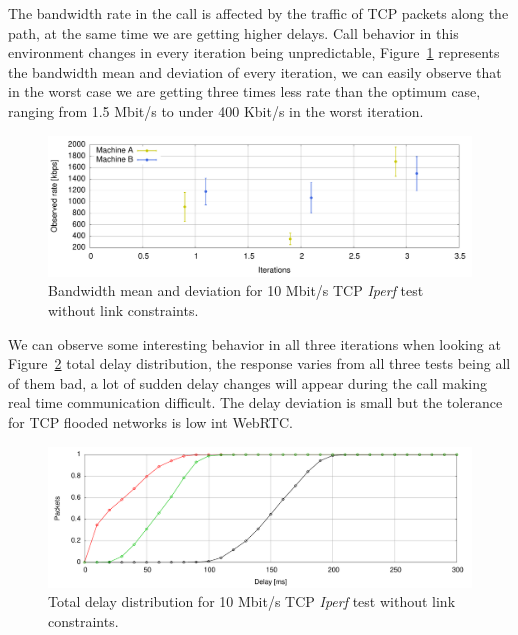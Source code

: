 The bandwidth rate in the call is affected by the traffic of TCP packets along the path, at the same time we are getting higher delays. Call behavior in this environment changes in every iteration being unpredictable, Figure~\ref{fig:iperfTestStd} represents the bandwidth mean and deviation of every iteration, we can easily observe that in the worst case we are getting three times less rate than the optimum case, ranging from 1.5 Mbit/s to under 400 Kbit/s in the worst iteration.

 \begin{figure}[h]
  \centering
    \includegraphics[width=1\textwidth]{./figures/iperf_std_mean_deviation_bw.pdf}
      \caption[Bandwidth mean and deviation for 10 Mbit/s TCP {\it Iperf} test without link constraints]{Bandwidth mean and deviation for 10 Mbit/s TCP {\it Iperf} test without link constraints.}
	\label{fig:iperfTestStd}
\end{figure}

We can observe some interesting behavior in all three iterations when looking at Figure~\ref{fig:iperfTestStdDelay} total delay distribution, the response varies from all three tests being all of them bad, a lot of sudden delay changes will appear during the call making real time communication difficult. The delay deviation is small but the tolerance for TCP flooded networks is low int WebRTC.

 \begin{figure}[h]
  \centering
    \includegraphics[width=1\textwidth]{./figures/iperf_std_total_delay_distribution.pdf}
      \caption[Total delay distribution for 10 Mbit/s TCP {\it Iperf} test without link constraints]{Total delay distribution for 10 Mbit/s TCP {\it Iperf} test without link constraints.}
	\label{fig:iperfTestStdDelay}
\end{figure}


